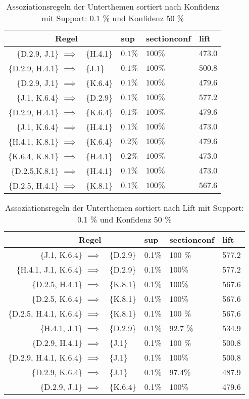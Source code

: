 \begin{table}[H]
\centering %
\begin{tabular}{|rl|l|l|l|}
	\hline
	\textbf{Regel}& &\textbf{sup} &section\textbf{conf} &\textbf{lift}\\
	\hline
	\{D.2.9, J.1\} $\implies$ & \{H.4.1\} & $0.1\%$ &$ 100 \%$ & $473.0$\\
	\{D.2.9, H.4.1\} $\implies$ & \{J.1\} & $0.1\%$ & $100 \%$ & $500.8$\\
	\{D.2.9, J.1\} $\implies$ & \{K.6.4\} & $0.1\%$ & $100 \%$ & $479.6$\\
	\{J.1, K.6.4\} $\implies$ & \{D.2.9\} & $0.1\%$ & $100 \%$ & $577.2$\\
	\{D.2.9, H.4.1\} $\implies$ & \{K.6.4\} &$0.1\%$ & $100 \%$ & $479.6$\\
	\{J.1, K.6.4\} $\implies$ & \{H.4.1\} & $0.1\%$ & $100 \%$ & $473.0$\\
	\{H.4.1, K.8.1\} $\implies$ & \{K.6.4\} &$ 0.2\%$ & $100 \%$ & $479.6$\\
	\{K.6.4, K.8.1\} $\implies$ & \{H.4.1\} &$ 0.2\%$ & $100 \%$ & $473.0$\\
	\{D.2.5,K.8.1\} $\implies$ & \{H.4.1\}  &$ 0.1\%$ & $100 \%$ & $473.0$\\
	\{D.2.5, H.4.1\} $\implies$ & \{K.8.1\} &$0.1\%$ & $100 \%$ & $567.6$\\
	\hline
\end{tabular}
 \caption{Assoziationsregeln der Unterthemen sortiert nach Konfidenz mit  Support: 0.1 \% und Konfidenz 50 \%}
\end{table}
\begin{table}[H]
\centering %
\begin{tabular}{|rl|l|l|l|}
	\hline
	\textbf{Regel}& &\textbf{sup} &section\textbf{conf} &\textbf{lift}\\
	\hline
	\{J.1, K.6.4\} $\implies$ &\{D.2.9\} &0.1\% & 100 \% & 577.2 \\
	\{H.4.1, J.1, K.6.4\} $\implies$ & \{D.2.9\} &0.1\%& 100\% & 577.2\\
	\{D.2.5, H.4.1\} $\implies$ & \{K.8.1\} &0.1\%& 100\% & 567.6\\
	\{D.2.5, K.6.4\} $\implies$ & \{K.8.1\} &0.1\%& 100\% & 567.6\\
	\{D.2.5, H.4.1, K.6.4\} $\implies$ & \{K.8.1\} &0.1\%& 100 \% & 567.6\\
	\{H.4.1, J.1\} $\implies$ & \{D.2.9\} &0.1\%& 92.7 \% & 534.9\\
	\{D.2.9, H.4.1\} $\implies$ & \{J.1\} &0.1\%& 100 \% & 500.8\\
	\{D.2.9, H.4.1, K.6.4\} $\implies$ & \{J.1\} &0.1\%& 100\% & 500.8\\
	\{D.2.9, K.6.4\} $\implies$ & \{J.1\} &0.1\%& 97.4\% & 487.9\\
	\{D.2.9, J.1\} $\implies$ & \{K.6.4\} &0.1\%& 100\% & 479.6\\
	\hline
\end{tabular}
 \caption{Assoziationsregeln der Unterthemen sortiert nach Lift mit  Support: 0.1 \% und Konfidenz 50 \%}
\end{table}

